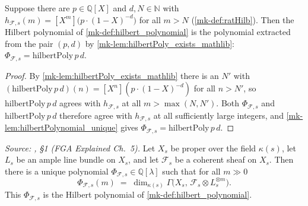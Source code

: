 \begin{corollary}\label{mk-cor:hilbertPolynomial_eq_hilbertPoly}
  \leanok

  Suppose there are \(p \in \mathbb{Q}[X]\) and \(d, N \in \mathbb{N}\) with
  \(h_{\mathcal{F},s}(m) = [X^m]\bigl(p \cdot (1-X)^{-d}\bigr)\) for all
  \(m > N\) (\ref{mk-def:ratHilb}). Then the Hilbert polynomial of
  \ref{mk-def:hilbert_polynomial} is the polynomial extracted from the pair
  \((p, d)\) by \ref{mk-lem:hilbertPoly_exists_mathlib}:
  \(\Phi_{\mathcal{F},s} = \mathrm{hilbertPoly}\,p\,d\).
\end{corollary}

\begin{proof}
  \leanok
  By \ref{mk-lem:hilbertPoly_exists_mathlib} there is an \(N'\) with
  \((\mathrm{hilbertPoly}\,p\,d)(n) = [X^n](p\cdot(1-X)^{-d})\) for all
  \(n > N'\), so \(\mathrm{hilbertPoly}\,p\,d\) agrees with
  \(h_{\mathcal{F},s}\) at all \(m > \max(N, N')\). Both
  \(\Phi_{\mathcal{F},s}\) and \(\mathrm{hilbertPoly}\,p\,d\) therefore agree
  with \(h_{\mathcal{F},s}\) at all sufficiently large integers, and
  \ref{mk-lem:hilbertPolynomial_unique} gives
  \(\Phi_{\mathcal{F},s} = \mathrm{hilbertPoly}\,p\,d\).
\end{proof}

\begin{theorem}
  \label{mk-thm:hilbertPoly_of_sectionModule}

  \textit{Source: \cite{nitsure-hilbert-quot}, \S 1 (FGA Explained Ch.~5).}
  Let \(X_s\) be proper over the field \(\kappa(s)\), let \(L_s\) be an ample line
  bundle on \(X_s\), and let \(\mathcal{F}_s\) be a coherent sheaf on \(X_s\).
  Then there is a unique polynomial \(\Phi_{\mathcal{F},s} \in \mathbb{Q}[\lambda]\)
  such that for all \(m \gg 0\)
  \[
    \Phi_{\mathcal{F},s}(m)
    \;=\; \dim_{\kappa(s)} \Gamma\bigl(X_s,\, \mathcal{F}_s \otimes L_s^{\otimes m}\bigr).
  \]
  This \(\Phi_{\mathcal{F},s}\) is the Hilbert polynomial of
  \ref{mk-def:hilbert_polynomial}.

\end{theorem}

